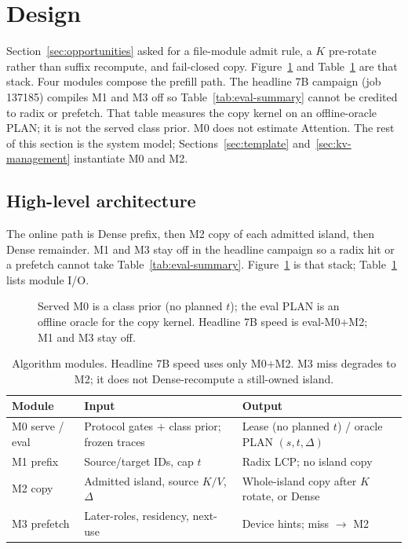 \section{Design}
\label{sec:problem}

Section~\ref{sec:opportunities} asked for a file-module admit rule, a
$K$ pre-rotate rather than suffix recompute, and fail-closed copy.
Figure~\ref{fig:architecture} and Table~\ref{tab:module-io} are that
stack. Four modules compose the prefill path. The headline 7B campaign
(job 137185) compiles M1 and M3 off so Table~\ref{tab:eval-summary}
cannot be credited to radix or prefetch. That table measures the copy
kernel on an offline-oracle PLAN; it is not the served class prior.
M0 does not estimate Attention.
The rest of this section is the system model; Sections~\ref{sec:template}
and~\ref{sec:kv-management} instantiate M0 and M2.

\subsection{High-level architecture}

The online path is Dense prefix, then M2 copy of each admitted island,
then Dense remainder. M1 and M3 stay off in the headline campaign so a
radix hit or a prefetch cannot take Table~\ref{tab:eval-summary}.
Figure~\ref{fig:architecture} is that stack; Table~\ref{tab:module-io}
lists module I/O.

\begin{figure}[ht]
\centering
\resizebox{\columnwidth}{!}{}
\caption{Served M0 is a class prior (no planned $t$); the eval PLAN is
an offline oracle for the copy kernel. Headline 7B speed is eval-M0$+$M2;
M1 and M3 stay off.}
\label{fig:architecture}
\end{figure}

\begin{table}[ht]
\centering
\scriptsize
\setlength{\tabcolsep}{2.5pt}
\caption{Algorithm modules. Headline 7B speed uses only M0$+$M2.
M3 miss degrades to M2; it does not Dense-recompute a still-owned island.}
\label{tab:module-io}
\begin{tabular}{@{}p{}p{}p{}@{}}
\toprule
\textbf{Module} & \textbf{Input} & \textbf{Output} \\
\midrule
M0 serve / eval & Protocol gates $+$ class prior; frozen traces & Lease (no planned $t$) / oracle PLAN $(s,t,\Delta)$ \\
M1 prefix & Source/target IDs, cap $t$ & Radix LCP; no island copy \\
M2 copy & Admitted island, source $K/V$, $\Delta$ & Whole-island copy after $K$ rotate, or Dense \\
M3 prefetch & Later-roles, residency, next-use & Device hints; miss $\to$ M2 \\
\bottomrule
\end{tabular}
\end{table}


